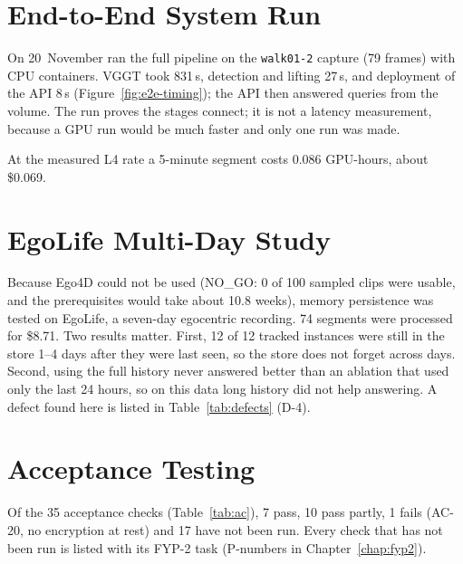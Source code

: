 
\section{End-to-End System Run}
\label{sec:e2e}
On 20~November  ran the full pipeline on the
\texttt{walk01-2} capture (79 frames) with CPU containers. VGGT took 831\,s,
detection and lifting 27\,s, and deployment of the API 8\,s
(Figure~\ref{fig:e2e-timing}); the API then answered queries from the volume.
The run proves the stages connect; it is not a latency measurement, because a GPU
run would be much faster and only one run was made.


At the measured L4 rate a 5-minute segment costs 0.086 GPU-hours, about
\$0.069.

\section{EgoLife Multi-Day Study}
\label{sec:egolife}
Because Ego4D could not be used (NO\_GO: 0 of 100 sampled clips were usable, and
the prerequisites would take about 10.8 weeks), memory persistence was tested on
EgoLife, a seven-day egocentric recording. 74 segments were processed for
\$8.71. Two results matter. First, 12 of 12 tracked instances were still in the
store 1--4 days after they were last seen, so the store does not forget across
days. Second, using the full history never answered better than an ablation that
used only the last 24 hours, so on this data long history did not help
answering. A defect found here is listed in Table~\ref{tab:defects} (D-4).

\section{Acceptance Testing}
Of the 35 acceptance checks (Table~\ref{tab:ac}), 7 pass, 10 pass partly, 1
fails (AC-20, no encryption at rest) and 17 have not been run. Every check that
has not been run is listed with its FYP-2 task (P-numbers in
Chapter~\ref{chap:fyp2}).

